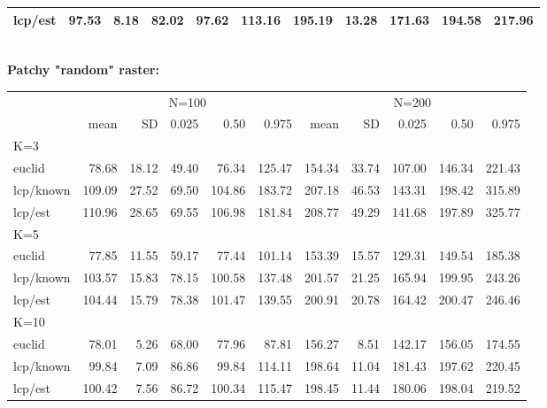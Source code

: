 \documentclass[12pt]{article}
\begin{document}
\begin{table}[h!]
{\begin{tabular}{l|rrrrr|rrrrr}
lcp/est  &  97.53 & 8.18 & 82.02 & 97.62& 113.16 & 195.19& 13.28& 171.63& 194.58& 217.96\\ \hline
\end{tabular}
\\
{\bf Patchy "random" raster: } \\
\begin{tabular}{l|rrrrrrrrrr}
         & \multicolumn{5}{c}{N=100  } & \multicolumn{5}{c}{N=200   }  \\
         &   mean &  SD  & 0.025 & 0.50  & 0.975  & mean  & SD   & 0.025 & 0.50  & 0.975 \\ \hline
K=3      &        &      &       &       &        &       &      &       &       &       \\
euclid   &  78.68 & 18.12& 49.40 & 76.34 & 125.47 & 154.34& 33.74& 107.00& 146.34& 221.43\\
lcp/known& 109.09 & 27.52& 69.50 &104.86 & 183.72 & 207.18& 46.53& 143.31& 198.42& 315.89\\
lcp/est  & 110.96 & 28.65& 69.55 &106.98 & 181.84 & 208.77& 49.29& 141.68& 197.89& 325.77\\
K=5      &        &      &       &       &        &       &      &       &       &        \\
euclid   &  77.85 & 11.55& 59.17 & 77.44 & 101.14 & 153.39& 15.57& 129.31& 149.54& 185.38\\
lcp/known& 103.57 & 15.83& 78.15 &100.58 & 137.48 & 201.57& 21.25& 165.94& 199.95& 243.26\\
lcp/est  & 104.44 & 15.79& 78.38 &101.47 & 139.55 & 200.91& 20.78& 164.42& 200.47& 246.46\\
K=10     &        &      &       &       &        &       &      &       &       &       \\
euclid   &  78.01 & 5.26 & 68.00 & 77.96 & 87.81  & 156.27&  8.51& 142.17& 156.05& 174.55\\
lcp/known&  99.84 & 7.09 & 86.86 & 99.84 & 114.11 & 198.64& 11.04& 181.43& 197.62& 220.45\\
lcp/est  & 100.42 & 7.56 & 86.72 &100.34 & 115.47 & 198.45& 11.44& 180.06& 198.04& 219.52\\ \hline
\end{tabular}
}
\label{tab.results1}
\end{table}
\end{document}
